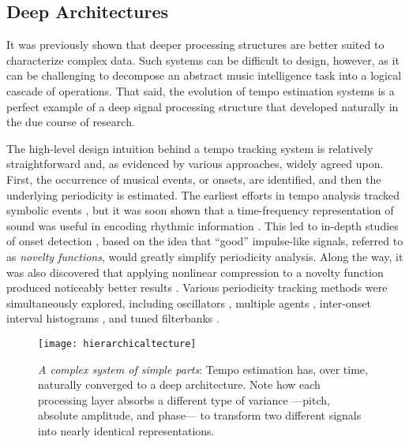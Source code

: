 \subsection{Deep Architectures}
\label{subsec:deep_architectures}

It was previously shown that deeper processing structures are better suited to characterize complex data.
Such systems can be difficult to design, however, as it can be challenging to decompose an abstract music intelligence task into a logical cascade of operations.
That said, the evolution of tempo estimation systems is a perfect example of a deep signal processing structure that developed naturally in the due course of research.

The high-level design intuition behind a tempo tracking system is relatively straightforward and, as evidenced by various approaches, widely agreed upon.
First, the occurrence of musical events, or onsets, are identified, and then the underlying periodicity is estimated.
The earliest efforts in tempo analysis tracked symbolic events \cite{Dannenberg1984Online}, but it was soon shown that a time-frequency representation of sound was useful in encoding rhythmic information \cite{Scheirer1998Tempo}.
This led to in-depth studies of onset detection \cite{Bello2005Tutorial}, based on the idea that ``good'' impulse-like signals, referred to as \emph{novelty functions}, would greatly simplify periodicity analysis.
Along the way, it was also discovered that applying nonlinear compression to a novelty function produced noticeably better results \cite{Klapuri2006Analysis}.
Various periodicity tracking methods were simultaneously explored, including oscillators \cite{Large1994Resonance}, multiple agents \cite{Goto1995Realtime}, inter-onset interval histograms \cite{Dixon2007Evaluation}, and tuned filterbanks \cite{Grosche2011Extracting}.


\begin{figure}
\begin{centering}
\texttt{[image: hierarchicaltecture]}
\caption{\emph{A complex system of simple parts}: Tempo estimation has, over time, naturally converged to a deep architecture. Note how each processing layer absorbs a different type of variance ---pitch, absolute amplitude, and phase--- to transform two different signals into nearly identical representations.}
\label{fig:hierarchicaltecture}
\end{centering}
\end{figure}

